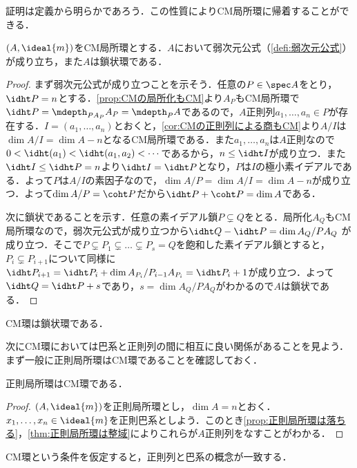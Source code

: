 証明は定義から明らかであろう．この性質によりCM局所環に帰着することができる．

\begin{thm}
	$(A,\ideal{m})$をCM局所環とする．$A$において弱次元公式（\ref{defi:弱次元公式}）が成り立ち，また$A$は鎖状環である．
\end{thm}

\begin{proof}
	まず弱次元公式が成り立つことを示そう．任意の$P\in\spec A$をとり，$\idht P=n$とする．\ref{prop:CMの局所化もCM}より$A_P$もCM局所環で$\idht P=\mdepth_{PA_P} A_P=\mdepth_P A$であるので，$A$正則列$a_1,\dots,a_n\in P$が存在する．$I=(a_1,\dots,a_n)$とおくと，\ref{cor:CMの正則列による商もCM}より$A/I$は$\dim A/I=\dim A-n$となるCM局所環である．また$a_1,\dots,a_n$は$A$正則なので$0<\idht(a_1)<\idht(a_1,a_2)<\cdots$であるから，$n\leq\idht I$が成り立つ．また$\idht I\leq\idht P=n$より$\idht I=\idht P$となり，$P$は$I$の極小素イデアルである．よって$P$は$A/I$の素因子なので，$\dim A/P=\dim A/I=\dim A-n$が成り立つ．よって$\dim A/P=\coht P$だから$\idht P+\coht P=\dim A$である．
	
	次に鎖状であることを示す．任意の素イデアル鎖$P\subsetneq Q$をとる．局所化$A_Q$もCM局所環なので，弱次元公式が成り立つから$\idht Q-\idht P=\dim A_Q/PA_Q$
	が成り立つ．そこで$P\subsetneq P_1\subsetneq \dots\subsetneq P_s=Q$を飽和した素イデアル鎖とすると，$P_i\subsetneq P_{i+1}$について同様に$\idht P_{i+1}=\idht P_i+\dim A_{P_i}/P_{i-1}A_{P_i}=\idht P_i+1$が成り立つ．よって$\idht Q=\idht P+s$であり，$s=\dim A_Q/PA_Q$がわかるので$A$は鎖状である．
\end{proof}

\begin{cor}
	CM環は鎖状環である．
\end{cor}

次にCM環においては巴系と正則列の間に相互に良い関係があることを見よう．まず一般に正則局所環はCM環であることを確認しておく．

\begin{prop}[Cohen]
	正則局所環はCM環である．
\end{prop}

\begin{proof}
	$(A,\ideal{m})$を正則局所環とし，$\dim A=n$とおく．$x_1,\dots,x_n\in\ideal{m}$を正則巴系としよう．このとき\ref{prop:正則局所環は落ちる}，\ref{thm:正則局所環は整域}によりこれらが$A$正則列をなすことがわかる．
\end{proof}

CM環という条件を仮定すると，正則列と巴系の概念が一致する．

